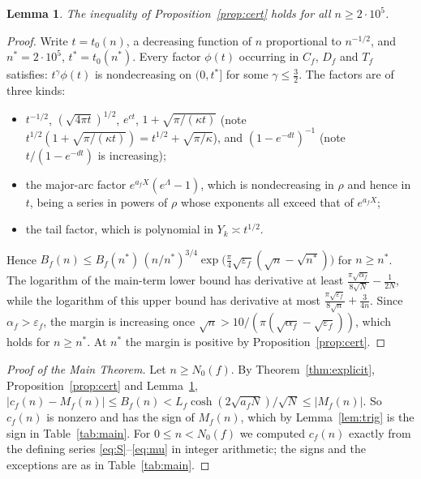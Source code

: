 \documentclass[11pt]{amsart}
\newtheorem{lemma}[theorem]{Lemma}
\theoremstyle{definition}
\theoremstyle{remark}
\numberwithin{equation}{section}
\begin{document}
\begin{lemma}\label{lem:large}
The inequality of Proposition~\ref{prop:cert} holds for all $n\ge2\cdot10^5$.
\end{lemma}

\begin{proof}
Write $t=t_0(n)$, a decreasing function of $n$ proportional to $n^{-1/2}$, and $n^*=2\cdot10^5$, $t^*=t_0(n^*)$.
Every factor $\phi(t)$ occurring in $C_f$, $D_f$ and $T_f$ satisfies: $t^{\gamma}\phi(t)$ is nondecreasing on $(0,t^*]$ for some $\gamma\le\frac32$.
The factors are of three kinds:
\begin{itemize}
\item $t^{-1/2}$, $(\sqrt{4\pi t})^{1/2}$, $e^{ct}$, $1+\sqrt{\pi/(\kappa t)}$ (note $t^{1/2}(1+\sqrt{\pi/(\kappa t)})=t^{1/2}+\sqrt{\pi/\kappa}$), and $(1-e^{-dt})^{-1}$ (note $t/(1-e^{-dt})$ is increasing);
\item the major-arc factor $e^{a_fX}(e^{\Lambda}-1)$, which is nondecreasing in $\rho$ and hence in $t$, being a series in powers of $\rho$ whose exponents all exceed that of $e^{a_fX}$;
\item the tail factor, which is polynomial in $Y_k\asymp t^{1/2}$.
\end{itemize}
Hence $B_f(n)\le B_f(n^*)\,(n/n^*)^{3/4}\exp\big(\frac\pi4\sqrt{\varepsilon_f}(\sqrt n-\sqrt{n^*})\big)$ for $n\ge n^*$.
The logarithm of the main-term lower bound has derivative at least $\frac{\pi\sqrt{\alpha_f}}{8\sqrt N}-\frac1{2N}$, while the logarithm of this upper bound has derivative at most $\frac{\pi\sqrt{\varepsilon_f}}{8\sqrt n}+\frac3{4n}$.
Since $\alpha_f>\varepsilon_f$, the margin is increasing once $\sqrt n>10/(\pi(\sqrt{\alpha_f}-\sqrt{\varepsilon_f}))$, which holds for $n\ge n^*$.
At $n^*$ the margin is positive by Proposition~\ref{prop:cert}.
\end{proof}

\begin{proof}[Proof of the Main Theorem]
Let $n\ge N_0(f)$.
By Theorem~\ref{thm:explicit}, Proposition~\ref{prop:cert} and Lemma~\ref{lem:large},
$|c_f(n)-M_f(n)|\le B_f(n)<L_f\cosh(2\sqrt{a_fN})/\sqrt N\le|M_f(n)|$.
So $c_f(n)$ is nonzero and has the sign of $M_f(n)$, which by Lemma~\ref{lem:trig} is the sign in Table~\ref{tab:main}.
For $0\le n<N_0(f)$ we computed $c_f(n)$ exactly from the defining series \eqref{eq:S}--\eqref{eq:mu} in integer arithmetic; the signs and the exceptions are as in Table~\ref{tab:main}.
\end{proof}
\end{document}
